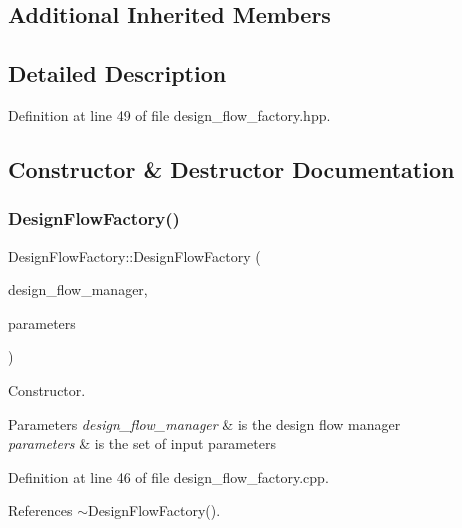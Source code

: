 \subsection*{Additional Inherited Members}


\subsection{Detailed Description}


Definition at line 49 of file design\+\_\+flow\+\_\+factory.\+hpp.



\subsection{Constructor \& Destructor Documentation}
\mbox{\label{classDesignFlowFactory_a8b5cd27c16a15aa26cfb34076d30982d}} 
\subsubsection{\texorpdfstring{Design\+Flow\+Factory()}{DesignFlowFactory()}}
{\footnotesize\ttfamily Design\+Flow\+Factory\+::\+Design\+Flow\+Factory (\begin{DoxyParamCaption}\item[{const Design\+Flow\+Manager\+Const\+Ref}]{design\+\_\+flow\+\_\+manager,  }\item[{const \hyperlink{Parameter_8hpp_a37841774a6fcb479b597fdf8955eb4ea}{Parameter\+Const\+Ref}}]{parameters }\end{DoxyParamCaption})}



Constructor. 


\begin{DoxyParams}{Parameters}
{\em design\+\_\+flow\+\_\+manager} & is the design flow manager \\
\hline
{\em parameters} & is the set of input parameters \\
\hline
\end{DoxyParams}


Definition at line 46 of file design\+\_\+flow\+\_\+factory.\+cpp.



References $\sim$\+Design\+Flow\+Factory().

